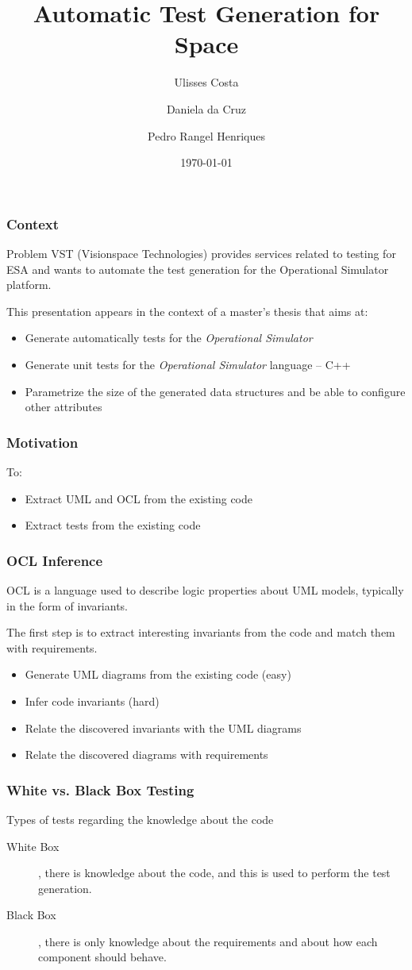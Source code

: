 \documentclass{beamer}
\title{Automatic Test Generation for Space}
\author{Ulisses Costa \and Daniela da Cruz \and Pedro Rangel Henriques}
\institute{SLATE'12 - Symposium on Languages, Applications and Technologies}
\date{\today}
\begin{document}
\begin{frame}
   \titlepage
\end{frame}

\begin{frame}\frametitle{Context}
\begin{block}{Problem}
VST (Visionspace Technologies) provides services related to testing for ESA and wants to automate
the test generation for the Operational Simulator platform.
\end{block}

This presentation appears in the context of a master's thesis that aims at:
\begin{itemize}
\item Generate automatically tests for the \textit{Operational Simulator}
\item Generate unit tests for the \textit{Operational Simulator} language -- C++
\item Parametrize the size of the generated data structures and be able to configure other attributes
\end{itemize}
\end{frame}

\begin{frame}\frametitle{Motivation}
To:
\begin{itemize}
\item Extract UML and OCL from the existing code
\item Extract tests from the existing code
\end{itemize}
\end{frame}

\begin{frame}\frametitle{OCL Inference}
OCL is a language used to describe logic properties about UML models, typically in the form of invariants.

The first step is to extract interesting invariants from the code and match them with requirements.
\begin{itemize}
\item Generate UML diagrams from the existing code (easy)
\item Infer code invariants (hard)
\item Relate the discovered invariants with the UML diagrams
\item Relate the discovered diagrams with requirements
\end{itemize}
\end{frame}

\begin{frame}\frametitle{White vs. Black Box Testing}
\begin{block}{Types of tests regarding the knowledge about the code}
\begin{description}
\item[White Box], there is knowledge about the code, and this is used to perform the test generation.
\item[Black Box], there is only knowledge about the requirements and about how each component should behave.
\end{description}
\end{block}
\end{frame}
\end{document}
